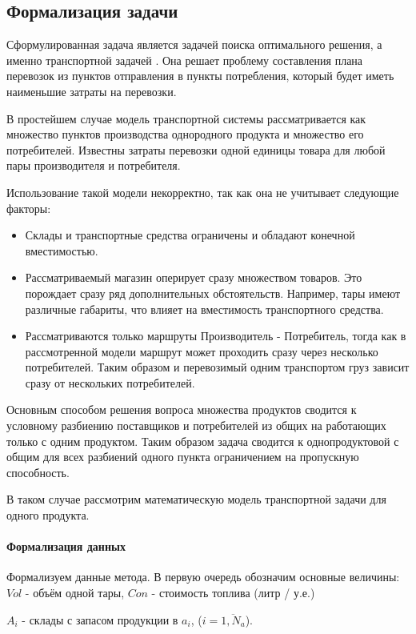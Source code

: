 \subsection{Формализация задачи}
	Сформулированная задача является задачей поиска оптимального решения, а именно транспортной задачей \cite{trans:main}. Она решает проблему составления плана перевозок из пунктов отправления в пункты потребления, который будет иметь наименьшие затраты на перевозки. 
	
	В простейшем случае модель транспортной системы рассматривается как множество пунктов производства однородного продукта и множество его потребителей. Известны затраты перевозки одной единицы товара для любой пары производителя и потребителя.
	
	Использование такой модели некорректно, так как она не учитывает следующие факторы:
	\begin{itemize}
		\item Склады и транспортные средства ограничены и обладают конечной вместимостью.
		\item Рассматриваемый магазин оперирует сразу множеством товаров. Это порождает сразу ряд дополнительных обстоятельств. Например, тары имеют различные габариты, что влияет на вместимость транспортного средства.
		\item Рассматриваются только маршруты Производитель - Потребитель, тогда как в рассмотренной модели маршрут может проходить сразу через несколько потребителей. Таким образом и перевозимый одним транспортом груз зависит сразу от нескольких потребителей.
	\end{itemize}
		
	Основным способом решения вопроса множества продуктов сводится к условному разбиению поставщиков и потребителей из общих на работающих только с одним продуктом. Таким образом задача сводится к однопродуктовой с общим для всех разбиений одного пункта ограничением на пропускную способность.
	
	В таком случае рассмотрим математическую модель транспортной задачи для одного продукта.
	\paragraph{Формализация данных}
	Формализуем данные метода. В первую очередь обозначим основные величины: $Vol$ - объём одной тары, $Con$ - стоимость топлива (литр / у.е.)
	
	$A_i$ - склады с запасом продукции в $a_i$, ($i = \overline{1, N_a}$).
	
